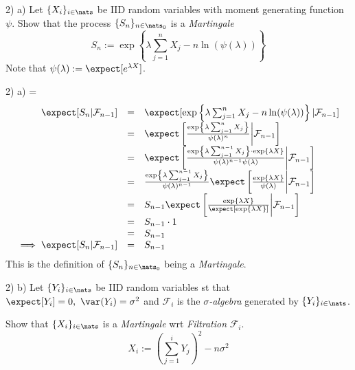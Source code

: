 \documentclass[11pt,a4paper]{article}
\begin{document}
\begin{question}{2) a)}
  Let $\{X_i\}_{i\in\nats}$ be IID random variables with moment generating function $\psi$. Show that the process $\{S_n\}_{n\in\nats_0}$ is a \textit{Martingale}
  \[ S_n:=\exp\left\{\lambda\sum_{j=1}^nX_j-n\ln(\psi(\lambda))\right\} \]
  Note that $\psi(\lambda):=\expect[e^{\lambda X}]$.
\end{question}

\begin{answer}{2) a)}
  \everymath={\displaystyle}
  \[\begin{array}{rcl}
    \expect[S_n|\mathcal{F}_{n-1}]&=&\expect[\exp\left\{\lambda\sum_{j=1}^nX_j-n\ln(\psi(\lambda))\right\}|\mathcal{F}_{n-1}]\\
    &=&\expect\left[\frac{\exp\left\{\lambda\sum_{j=1}^nX_j\right\}}{\psi(\lambda)^n}\bigg|\mathcal{F}_{n-1}\right]\\
    &=&\expect\left[\frac{\exp\left\{\lambda\sum_{j=1}^{n-1}X_j\right\}\cdot\exp\{\lambda X\}}{\psi(\lambda)^{n-1}\psi(\lambda)}\bigg|\mathcal{F}_{n-1}\right]\\
    &=&\frac{\exp\left\{\lambda\sum_{j=1}^{n-1}X_j\right\}}{\psi(\lambda)^{n-1}}\expect\left[\frac{\exp\{\lambda X\}}{\psi(\lambda)}\bigg|\mathcal{F}_{n-1}\right]\\
    &=&S_{n-1}\expect\left[\frac{\exp\{\lambda X\}}{\expect[\exp\{\lambda X\}]}\bigg|\mathcal{F}_{n-1}\right]\\
    &=&S_{n-1}\cdot1\\
    &=&S_{n-1}\\
    \implies\expect[S_n|\mathcal{F}_{n-1}]&=&S_{n-1}
  \end{array}\]
  This is the definition of $\{S_n\}_{n\in\nats_0}$ being a \textit{Martingale}.
\end{answer}

\begin{question}{2) b)}
  Let $\{Y_i\}_{i\in\nats}$ be IID random variables st that $\expect[Y_i]=0,\ \var(Y_i)=\sigma^2$ and $\mathcal{F}_i$ is the \textit{$\sigma$-algebra} generated by $\{Y_i\}_{i\in\nats}$.
  \par Show that $\{X_i\}_{i\in\nats}$ is a \textit{Martingale} wrt \textit{Filtration} $\mathcal{F}_i$.
  \[ X_i:=\left(\sum_{j=1}^iY_j\right)^2-n\sigma^2 \]
\end{question}
\end{document}
